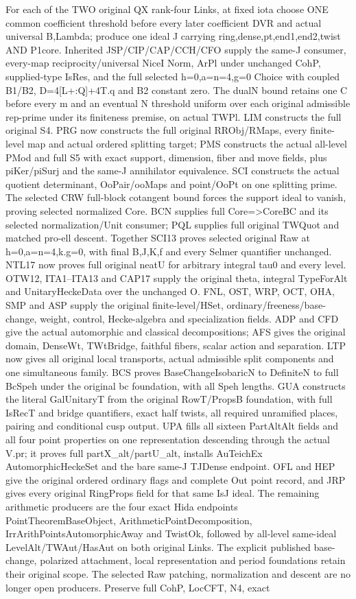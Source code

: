 \documentclass[11pt,a4paper]{article}
\numberwithin{equation}{section}
\theoremstyle{remark}\newtheorem{remark}[theorem]{Remark}
\begin{document}
For each of the TWO original QX rank-four Links, at fixed iota choose ONE common coefficient threshold before every later coefficient DVR and actual universal B,Lambda; produce one ideal J carrying ring,dense,pt,end1,end2,twist AND P1core. Inherited JSP/CIP/CAP/CCH/CFO supply the same-J consumer, every-map reciprocity/universal NiceI Norm, ArPl under unchanged CohP, supplied-type IsRes, and the full selected h=0,a=n=4,g=0 Choice with coupled B1/B2, D=4[L+:Q]+4T.q and B2 constant zero. The dualN bound retains one C before every m and an eventual N threshold uniform over each original admissible rep-prime under its finiteness premise, on actual TWPl. LIM constructs the full original S4. PRG now constructs the full original RRObj/RMaps, every finite-level map and actual ordered splitting target; PMS constructs the actual all-level PMod and full S5 with exact support, dimension, fiber and move fields, plus piKer/piSurj and the same-J annihilator equivalence. SCI constructs the actual quotient determinant, OoPair/ooMaps and point/OoPt on one splitting prime. The selected CRW full-block cotangent bound forces the support ideal to vanish, proving selected normalized Core. BCN supplies full Core=>CoreBC and its selected normalization/Unit consumer; PQL supplies full original TWQuot and matched pro-ell descent. Together SCI13 proves selected original Raw at h=0,a=n=4,k.g=0, with final B,J,K,f and every Selmer quantifier unchanged. NTL17 now proves full original neatU for arbitrary integral tau0 and every level. OTW12, ITA1–ITA13 and CAP17 supply the original theta, integral TypeForAlt and UnitaryHeckeData over the unchanged O. FNL, OST, WRP, OCT, OHA, SMP and ASP supply the original finite-level/HSet, ordinary/freeness/base-change, weight, control, Hecke-algebra and specialization fields. ADP and CFD give the actual automorphic and classical decompositions; AFS gives the original domain, DenseWt, TWtBridge, faithful fibers, scalar action and separation. LTP now gives all original local transports, actual admissible split components and one simultaneous family. BCS proves BaseChangeIsobaricN to DefiniteN to full BcSpeh under the original bc foundation, with all Speh lengths. GUA constructs the literal GalUnitaryT from the original RowT/PropsB foundation, with full IsRecT and bridge quantifiers, exact half twists, all required unramified places, pairing and conditional cusp output. UPA fills all sixteen PartAltAlt fields and all four point properties on one representation descending through the actual V.pr; it proves full partX\_\allowbreak alt/partU\_\allowbreak alt, installs AuTeichEx AutomorphicHeckeSet and the bare same-J TJDense endpoint. OFL and HEP give the original ordered ordinary flags and complete Out point record, and JRP gives every original RingProps field for that same IsJ ideal. The remaining arithmetic producers are the four exact Hida endpoints PointTheoremBaseObject, ArithmeticPointDecomposition, IrrArithPointsAutomorphicAway and TwistOk, followed by all-level same-ideal LevelAlt/TWAut/HasAut on both original Links. The explicit published base-change, polarized attachment, local representation and period foundations retain their original scope. The selected Raw patching, normalization and descent are no longer open producers. Preserve full CohP, LocCFT, N4, exact 
\end{document}
